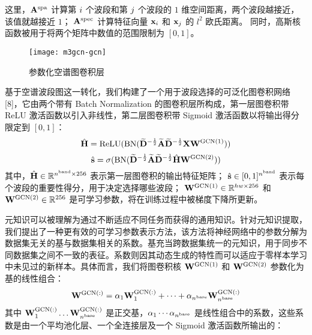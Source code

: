 这里，$\mathbf{A}^\text{spa}$ 计算第 $i$ 个波段和第 $j$ 个波段的 $1$ 维空间距离，两个波段越接近，该值就越接近 $1$；
$\mathbf{A}^\text{spec}$ 计算特征向量 $\mathbf{x}_{i}$ 和 $\mathbf{x}_{j}$ 的 $l^2$ 欧氏距离。
同时，高斯核函数被用于将两个矩阵中数值的范围限制为 $[0,1]$。
\par
\begin{figure}[h]
\centering
\texttt{[image: m3gcn-gcn]}
\caption{参数化空谱图卷积层}
\label{fig:m3gcn-gcn}
\end{figure}
\par
基于空谱波段图这一转化，我们构建了一个用于波段选择的可泛化图卷积网络[8]，它由两个带有 Batch Normalization 的图卷积层所构成，第一层图卷积带 ReLU 激活函数以引入非线性，第二层图卷积带 Sigmoid 激活函数以将输出得分限定到 $[0,1]$：
\begin{equation}
    \hat{\mathbf{H}} = \operatorname{ReLU}( \operatorname{BN}( \widetilde{\mathbf{D}}^{-\frac{1}{2}} \widetilde{\mathbf{A}} \widetilde{\mathbf{D}}^{-\frac{1}{2}} \mathbf{X} \mathbf{W}^\text{GCN(1)} ) )
    \label{eqn:gcn-gconv1}
\end{equation}
\begin{equation}
    \hat{\mathbf{s}} = \operatorname{\sigma}( \operatorname{BN}( \widetilde{\mathbf{D}}^{-\frac{1}{2}} \widetilde{\mathbf{A}} \widetilde{\mathbf{D}}^{-\frac{1}{2}} \hat{\mathbf{H}} \mathbf{W}^\text{GCN(2)} ) )
    \label{eqn:gcn-gconv2}
\end{equation}
其中，$\hat{\mathbf{H}} \in \mathbb{R}^{{n^\text{band}} \times 256}$ 表示第一层图卷积的输出特征矩阵；
$\hat{\mathbf{s}} \in [0, 1]^{{n^\text{band}}}$ 表示每个波段的重要性得分，用于决定选择哪些波段；
$\mathbf{W}^\text{GCN(1)} \in \mathbb{R}^{hw \times 256}$ 和 $\mathbf{W}^\text{GCN(2)} \in \mathbb{R}^{256}$ 是可学习参数，将在训练过程中被梯度下降所更新。
\par
元知识可以被理解为通过不断适应不同任务而获得的通用知识。针对元知识提取，我们提出了一种更有效的可学习参数表示方法，该方法将神经网络中的参数分解为数据集无关的基与数据集相关的系数。基充当跨数据集统一的元知识，用于同步不同数据集之间不一致的表征。系数则因其动态生成的特性而可以适应于零样本学习中未见过的新样本。具体而言，我们将图卷积核 $\mathbf{W}^\text{GCN(1)}$ 和 $\mathbf{W}^\text{GCN(2)}$ 参数化为基的线性组合：
\begin{equation}
    \mathbf{W}^\text{GCN(:)} = \alpha_1\mathbf{W}_1^\text{GCN(:)} + \dots + \alpha_{n^\text{base}}\mathbf{W}_{n^\text{base}}^\text{GCN(:)}
    \label{eqn:gcn-condconv}
\end{equation}
其中 $\mathbf{W}_1^\text{GCN(:)} \dots \mathbf{W}_{n^\text{base}}^\text{GCN(:)}$ 是正交基，$\alpha_1 \cdots \alpha_{n^\text{base}}$ 是线性组合中的系数，这些系数是由一个平均池化层、一个全连接层及一个 Sigmoid 激活函数所输出的：
